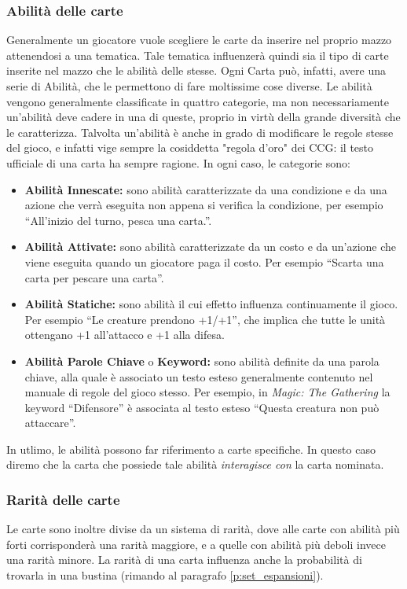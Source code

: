 \documentclass[12pt]{article}
\begin{document}
\subsubsection{Abilità delle carte}
Generalmente un giocatore vuole scegliere le carte da inserire nel proprio mazzo attenendosi a una tematica. Tale tematica influenzerà quindi sia il tipo di carte inserite nel mazzo che le abilità delle stesse. Ogni Carta può, infatti, avere una serie di Abilità, che le permettono di fare moltissime cose diverse. Le abilità vengono generalmente classificate in quattro categorie, ma non necessariamente un'abilità deve cadere in una di queste, proprio in virtù della grande diversità che le caratterizza. Talvolta un'abilità è anche in grado di modificare le regole stesse del gioco, e infatti vige sempre la cosiddetta "regola d'oro" dei CCG: il testo ufficiale di una carta ha sempre ragione. In ogni caso, le categorie sono: 
\begin{itemize}
    \item \textbf{Abilità Innescate:} sono abilità caratterizzate da una condizione e da una azione che verrà eseguita non appena si verifica la condizione, per esempio “All’inizio del turno, pesca una carta.”.
    \item  \textbf{Abilità Attivate:} sono abilità caratterizzate da un costo e da un’azione che viene eseguita quando un giocatore paga il costo. Per esempio “Scarta una carta per pescare una carta”.
    \item \textbf{Abilità Statiche:} sono abilità il cui effetto influenza continuamente il gioco. Per esempio “Le creature prendono +1/+1”, che implica che tutte le unità ottengano +1 all’attacco e +1 alla difesa.
    \item \textbf{Abilità Parole Chiave} o \textbf{Keyword:} sono abilità definite da una parola chiave, alla quale è associato un testo esteso generalmente contenuto nel manuale di regole del gioco stesso. Per esempio, in \textit{Magic: The Gathering} la keyword “Difensore” è associata al testo esteso “Questa creatura non può attaccare”.
\end{itemize}

 In utlimo, le abilità possono far riferimento a carte specifiche. In questo caso diremo che la carta che possiede tale abilità \textit{interagisce con} la carta nominata.

\subsubsection{Rarità delle carte}
Le carte sono inoltre divise da un sistema di rarità, dove alle carte con abilità più forti corrisponderà una rarità maggiore, e a quelle con abilità più deboli invece una rarità minore. La rarità di una carta influenza anche la probabilità di trovarla in una bustina (rimando al paragrafo \ref{p:set_espansioni}).
\end{document}
